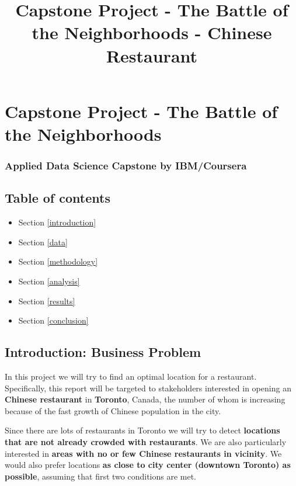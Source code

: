 \documentclass[11pt]{article}
\title{Capstone Project - The Battle of the Neighborhoods - Chinese Restaurant}
\providecommand{\tightlist}{%
      \setlength{\itemsep}{0pt}\setlength{\parskip}{0pt}}
\begin{document}
    
    
    \maketitle
    
    

    
    \section{Capstone Project - The Battle of the
Neighborhoods}\label{capstone-project---the-battle-of-the-neighborhoods}

\subsubsection{Applied Data Science Capstone by
IBM/Coursera}\label{applied-data-science-capstone-by-ibmcoursera}

    \subsection{Table of contents}\label{table-of-contents}

\begin{itemize}
\tightlist
\item
  Section \ref{introduction}
\item
  Section \ref{data}
\item
  Section \ref{methodology}
\item
  Section \ref{analysis}
\item
  Section \ref{results}
\item
  Section \ref{conclusion}
\end{itemize}

    \subsection{Introduction: Business Problem
}\label{introduction-business-problem}

    In this project we will try to find an optimal location for a
restaurant. Specifically, this report will be targeted to stakeholders
interested in opening an \textbf{Chinese restaurant} in
\textbf{Toronto}, Canada, the number of whom is increasing because of
the fast growth of Chinese population in the city.

Since there are lots of restaurants in Toronto we will try to detect
\textbf{locations that are not already crowded with restaurants}. We are
also particularly interested in \textbf{areas with no or few Chinese
restaurants in vicinity}. We would also prefer locations \textbf{as
close to city center (downtown Toronto) as possible}, assuming that
first two conditions are met.
\end{document}
